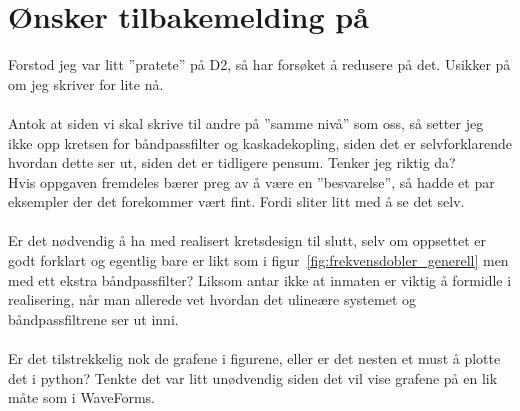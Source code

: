 \documentclass[a4paper,11pt,norsk]{article}
\begin{document}
\section{Ønsker tilbakemelding på}
Forstod jeg var litt ''pratete'' på D2, så har forsøket å redusere på det.
Usikker på om jeg skriver for lite nå.\\
\\
Antok at siden vi skal skrive til andre på ''samme nivå'' som oss, så setter jeg ikke opp kretsen for båndpassfilter og kaskadekopling, siden det er selvforklarende hvordan dette ser ut, siden det er tidligere pensum. Tenker jeg riktig da?
\\
Hvis oppgaven fremdeles bærer preg av å være en ''besvarelse'', så hadde et par eksempler der det forekommer vært fint. Fordi sliter litt med å se det selv.
\\
\\
Er det nødvendig å ha med realisert kretsdesign til slutt, selv om oppsettet er godt forklart og egentlig bare er likt som i figur~\ref{fig:frekvensdobler_generell} men med ett ekstra båndpassfilter? Liksom antar ikke at inmaten er viktig å formidle i realisering, når man allerede vet hvordan det ulineære systemet og båndpassfiltrene ser ut inni.
\\\\
Er det tilstrekkelig nok de grafene i figurene, eller er det nesten et must å plotte det i python? Tenkte det var litt unødvendig siden det vil vise grafene på en lik måte som i WaveForms.

\end{document}
